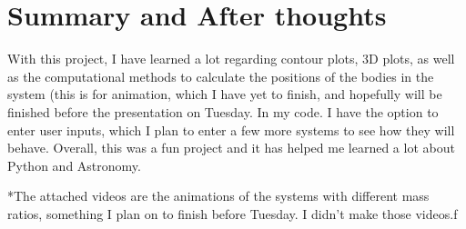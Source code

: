 \documentclass{article}
\begin{document}
\section{Summary and After thoughts}
With this project, I have learned a lot regarding contour plots, 3D plots, as well as the computational methods to calculate the positions of the bodies in the system (this is for animation, which I have yet to finish, and hopefully will be finished before the presentation on Tuesday. In my code. I have the option to enter user inputs, which I plan to enter a few more systems to see how they will behave. Overall, this was a fun project and it has helped me learned a lot about Python and Astronomy.

*The attached videos are the animations of the systems with different mass ratios, something I plan on to finish before Tuesday. I didn't make those videos.f
\end{document}
